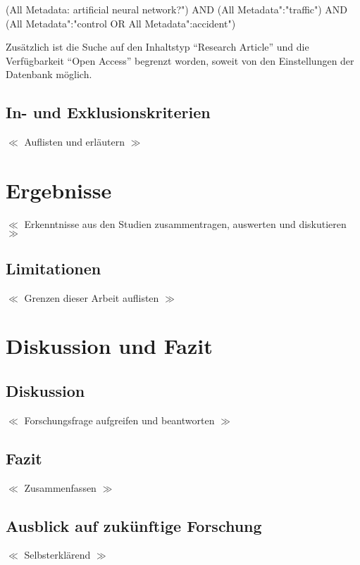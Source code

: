 \documentclass{scrartcl}
\begin{document}
\begin{tcolorbox}[
      enhanced,
      attach boxed title to top left,
      colback=gray!20,
      colframe=gray,
      colbacktitle=gray,
      title=IEEE Explore,
      fonttitle=\bfseries\color{black},
      boxed title style={size=small, colframe=gray, sharp corners},
      sharp corners
   ]
   (\dq All Metadata\dq: \dq artificial neural network?")
   AND (\dq All Metadata":"traffic")
   AND (\dq All Metadata":"control\dq\space
   OR \dq All Metadata":\dq accident")
\end{tcolorbox}

Zusätzlich ist die Suche auf den Inhaltstyp \enquote{Research Article}
und die Verfügbarkeit \enquote{Open Access} begrenzt worden, soweit von
den Einstellungen der Datenbank möglich.

\subsection{In- und Exklusionskriterien}

$\ll$ Auflisten und erläutern $\gg$

\section{Ergebnisse}

$\ll$ Erkenntnisse aus den Studien zusammentragen, auswerten und diskutieren $\gg$

\subsection{Limitationen}

$\ll$ Grenzen dieser Arbeit auflisten $\gg$

\section{Diskussion und Fazit}

\subsection{Diskussion}

$\ll$ Forschungsfrage aufgreifen und beantworten $\gg$

\subsection{Fazit}

$\ll$ Zusammenfassen $\gg$

\subsection{Ausblick auf zukünftige Forschung}

$\ll$ Selbsterklärend $\gg$

\printbibliography

\listoffigures
\listoftables
\end{document}
